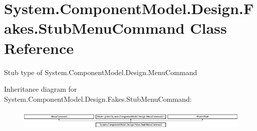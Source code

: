 \hypertarget{class_system_1_1_component_model_1_1_design_1_1_fakes_1_1_stub_menu_command}{\section{System.\-Component\-Model.\-Design.\-Fakes.\-Stub\-Menu\-Command Class Reference}
\label{class_system_1_1_component_model_1_1_design_1_1_fakes_1_1_stub_menu_command}
}


Stub type of System.\-Component\-Model.\-Design.\-Menu\-Command 


Inheritance diagram for System.\-Component\-Model.\-Design.\-Fakes.\-Stub\-Menu\-Command\-:\begin{figure}[H]
\begin{center}
\leavevmode
\includegraphics[height=0.967185cm]{class_system_1_1_component_model_1_1_design_1_1_fakes_1_1_stub_menu_command}
\end{center}
\end{figure}
